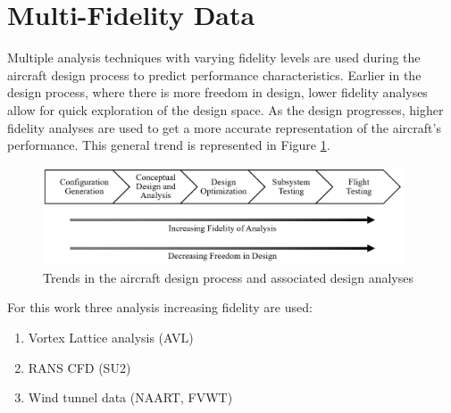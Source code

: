 \section{Multi-Fidelity Data}

Multiple analysis techniques with varying fidelity levels are used during the aircraft design process to predict performance characteristics. Earlier in the design process, where there is more freedom in design, lower fidelity analyses allow for quick exploration of the design space. As the design progresses, higher fidelity analyses are used to get a more accurate representation of the aircraft's performance. This general trend is represented in Figure \ref{fig:design_fidelity}.

\begin{figure}
    \center
    \includegraphics[width=0.95\textwidth]{images/design_fidelity.png}
    \caption{Trends in the aircraft design process and associated design analyses \label{fig:design_fidelity}}
\end{figure}

For this work three analysis increasing fidelity are used: 

\begin{enumerate}
    \item Vortex Lattice analysis (AVL)
    \item RANS CFD (SU2)
    \item Wind tunnel data (NAART, FVWT)
\end{enumerate}

